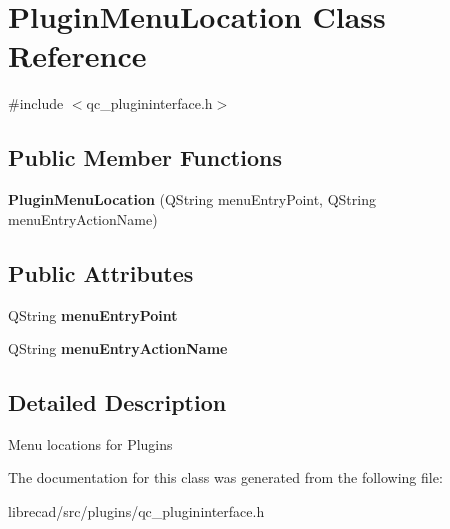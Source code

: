 \hypertarget{classPluginMenuLocation}{\section{Plugin\-Menu\-Location Class Reference}
\label{classPluginMenuLocation}
}


{\ttfamily \#include $<$qc\-\_\-plugininterface.\-h$>$}

\subsection*{Public Member Functions}
\begin{DoxyCompactItemize}
\item 
\hypertarget{classPluginMenuLocation_a8003bf0ea21436d9cc53784ffd858b97}{{\bfseries Plugin\-Menu\-Location} (Q\-String menu\-Entry\-Point, Q\-String menu\-Entry\-Action\-Name)}\label{classPluginMenuLocation_a8003bf0ea21436d9cc53784ffd858b97}

\end{DoxyCompactItemize}
\subsection*{Public Attributes}
\begin{DoxyCompactItemize}
\item 
\hypertarget{classPluginMenuLocation_a54ec9662feba833960dd928d5f64d1dd}{Q\-String {\bfseries menu\-Entry\-Point}}\label{classPluginMenuLocation_a54ec9662feba833960dd928d5f64d1dd}

\item 
\hypertarget{classPluginMenuLocation_ada2f31062f103b1b8dbc97a64057767d}{Q\-String {\bfseries menu\-Entry\-Action\-Name}}\label{classPluginMenuLocation_ada2f31062f103b1b8dbc97a64057767d}

\end{DoxyCompactItemize}


\subsection{Detailed Description}
Menu locations for Plugins 

The documentation for this class was generated from the following file\-:\begin{DoxyCompactItemize}
\item 
librecad/src/plugins/qc\-\_\-plugininterface.\-h\end{DoxyCompactItemize}
